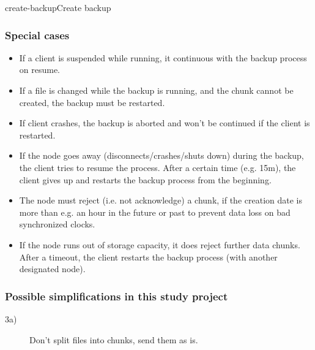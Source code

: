 \begin{scenario}{create-backup}{Create backup}
    \subsubsection{Special cases}
 	\begin{itemize}
	 	\item If a client is suspended while running, it continuous with the backup process on resume. %
	 	\item If a file is changed while the backup is running, and the chunk cannot be created, the backup must be restarted. %
		\item If client crashes, the backup is aborted and won't be continued if the client is restarted.
		\item If the node goes away (disconnects/crashes/shuts down) during the backup, the client tries to resume the process. After a certain time (e.g. 15m), the client gives up and restarts the backup process from the beginning.
		\item The node must reject (i.e. not acknowledge) a chunk, if the creation date is more than e.g. an hour in the future or past to prevent data loss on bad synchronized clocks.
		\item If the node runs out of storage capacity, it does reject further data chunks. After a timeout, the client restarts the backup process (with another designated node).
	\end{itemize}
	
	\subsubsection{Possible simplifications in this study project}
	\begin{description}
		\item[3a)] Don't split files into chunks, send them as is.
	\end{description}
    
\end{scenario}


